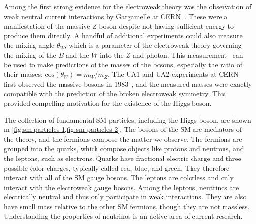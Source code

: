Among the first strong evidence for the electroweak theory was the observation of weak neutral current interactions by Gargamelle at CERN~\cite{1973.gargamelle-1,1973.gargamelle-2,1973.gargamelle-3}. These were a manifestation of the massive $Z$ boson despite not having sufficient energy to produce them directly. A handful of additional experiments could also measure the mixing angle $\theta_W$, which is a parameter of the electroweak theory governing the mixing of the $B$ and the $W$ into the $Z$ and photon. This measurement~\cite{1981.weinberg-angle-1,1981.weinberg-angle-2} can be used to make predictions of the masses of the bosons, especially the ratio of their masses: $\text{cos}(\theta_W) = m_W/m_Z$. The UA1 and UA2 experiments at CERN first observed the massive bosons in 1983~\cite{1983.UA1.discovery-of-W,1983.UA1.discovery-of-Z,1983.UA2.discovery-of-W,1983.UA2.discovery-of-Z}, and the measured masses were exactly compatible with the prediction of the broken electroweak symmetry. This provided compelling motivation for the existence of the Higgs boson.

The collection of fundamental SM particles, including the Higgs boson, are shown in \cref{fig:sm-particles-1,fig:sm-particles-2}. The bosons of the SM are mediators of the theory, and the fermions compose the matter we observe. The fermions are grouped into the quarks, which compose objects like protons and neutrons, and the leptons, such as electrons. Quarks have fractional electric charge and three possible color charges, typically called red, blue, and green. They therefore interact with all of the SM gauge bosons. The leptons are colorless and only interact with the electroweak gauge bosons. Among the leptons, neutrinos are electrically neutral and thus only participate in weak interactions. They are also have small mass relative to the other SM fermions, though they are not massless. Understanding the properties of neutrinos is an active area of current research.

